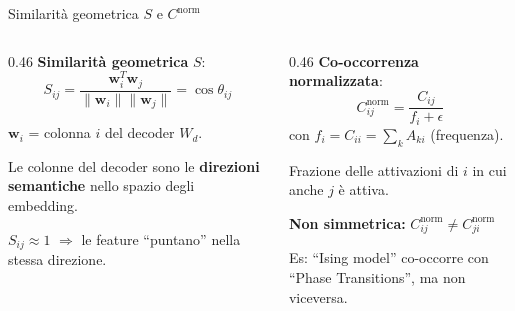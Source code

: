 \documentclass[aspectratio=169, 10pt]{beamer}
\begin{document}
\begin{frame}{Similarit\`a geometrica $S$ e $C^{\text{norm}}$}
    \begin{columns}[T]
        \begin{column}{0.46\textwidth}
            \textbf{Similarit\`a geometrica} $S$:
            {\small\[
                S_{ij} = \frac{\mathbf{w}_i^T \mathbf{w}_j}{\|\mathbf{w}_i\| \|\mathbf{w}_j\|} = \cos\theta_{ij}
            \]}

            {\small $\mathbf{w}_i$ = colonna $i$ del decoder $W_d$.}

            \vspace{0.2cm}
            {\small Le colonne del decoder sono le \textbf{direzioni semantiche} nello spazio degli embedding.}

            \vspace{0.2cm}
            {\small $S_{ij} \approx 1$ $\Rightarrow$ le feature ``puntano'' nella stessa direzione.}
        \end{column}
        \begin{column}{0.46\textwidth}
            \textbf{Co-occorrenza normalizzata}:
            \[
                C^{\text{norm}}_{ij} = \frac{C_{ij}}{f_i + \epsilon}
            \]
            con $f_i = C_{ii} = \sum_k A_{ki}$ (frequenza).

            \vspace{0.3cm}
            {\small Frazione delle attivazioni di $i$ in cui anche $j$ \`e attiva.}

            \vspace{0.2cm}
            {\small \textbf{Non simmetrica:} $C^{\text{norm}}_{ij} \neq C^{\text{norm}}_{ji}$}

            \vspace{0.2cm}
            {\small Es: ``Ising model'' co-occorre con ``Phase Transitions'', ma non viceversa.}
        \end{column}
    \end{columns}
\end{frame}
\end{document}
